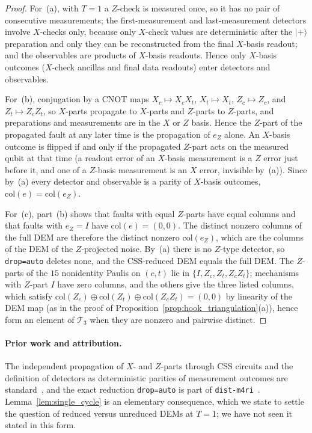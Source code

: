 \documentclass[12pt]{article}
\theoremstyle{definition}
\newcommand{\Tc}{\mathcal{T}_3}
\newcommand{\ttt}[1]{\texttt{#1}}
\begin{document}
\begin{proof}
For~(a), with $T = 1$ a $Z$-check is measured once, so it has no pair of consecutive measurements; the first-measurement
and last-measurement detectors involve $X$-checks only, because only $X$-check values are deterministic after the
$|+\rangle$ preparation and only they can be reconstructed from the final $X$-basis readout; and the observables are
products of $X$-basis readouts. Hence only $X$-basis outcomes ($X$-check ancillas and final data readouts) enter
detectors and observables.

For~(b), conjugation by a CNOT maps $X_c \mapsto X_c X_t$, $X_t \mapsto X_t$, $Z_c \mapsto Z_c$, and $Z_t \mapsto Z_c
Z_t$, so $X$-parts propagate to $X$-parts and $Z$-parts to $Z$-parts, and preparations and measurements are in the
$X$ or $Z$ basis. Hence the $Z$-part of the propagated fault at any later time is the propagation of $e_Z$ alone. An
$X$-basis outcome is flipped if and only if the propagated $Z$-part acts on the measured qubit at that time (a
readout error of an $X$-basis measurement is a $Z$ error just before it, and one of a $Z$-basis measurement is an $X$
error, invisible by~(a)). Since by~(a) every detector and observable is a parity of $X$-basis outcomes,
$\mathrm{col}(e) = \mathrm{col}(e_Z)$.

For~(c), part~(b) shows that faults with equal $Z$-parts have equal columns and that faults with $e_Z = I$ have
$\mathrm{col}(e) = (0, 0)$. The distinct nonzero columns of the full DEM are therefore the distinct nonzero
$\mathrm{col}(e_Z)$, which are the columns of the DEM of the $Z$-projected noise. By~(a) there is no $Z$-type
detector, so \ttt{drop=auto} deletes none, and the CSS-reduced DEM equals the full DEM. The $Z$-parts of the $15$
nonidentity Paulis on $(c, t)$ lie in $\{I, Z_c, Z_t, Z_c Z_t\}$; mechanisms with $Z$-part $I$ have zero columns, and
the others give the three listed columns, which satisfy $\mathrm{col}(Z_c) \oplus \mathrm{col}(Z_t) \oplus
\mathrm{col}(Z_c Z_t) = (0, 0)$ by linearity of the DEM map (as in the proof of
Proposition~\ref{prop:hook_triangulation}(a)), hence form an element of $\Tc$ when they are nonzero and pairwise
distinct.
\end{proof}

\paragraph{Prior work and attribution.}
The independent propagation of $X$- and $Z$-parts through CSS circuits and the definition of detectors as
deterministic parities of measurement outcomes are standard~\cite{Gottesman1997,Gidney2021Stim,DelfossePaetznick2023},
and the exact reduction \ttt{drop=auto} is part of \ttt{dist-m4ri}~\cite{PryadkoZeng2026DistM4RI}.
Lemma~\ref{lem:single_cycle} is an elementary consequence, which we state to settle the question of reduced versus
unreduced DEMs at $T = 1$; we have not seen it stated in this form.
\end{document}
